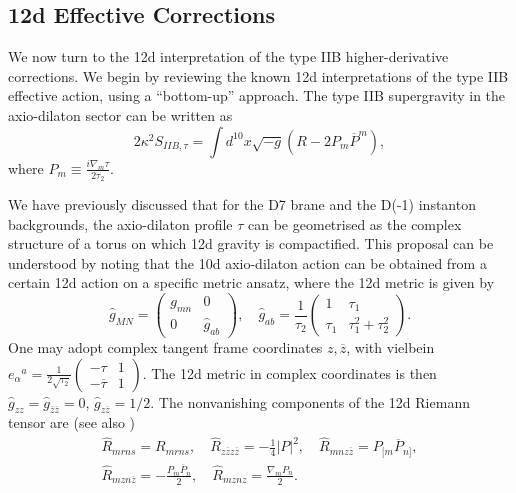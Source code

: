 \subsection{12d Effective Corrections}
We now turn to the 12d interpretation of the type IIB higher-derivative corrections.
We begin by reviewing the known 12d interpretations of the type IIB effective action, using a ``bottom-up'' approach.
The type IIB supergravity in the axio-dilaton sector can be written as
\begin{equation}
2\kappa^2 S_{IIB,\tau}
= \int d^{10}x \sqrt{-g} \left(R - 2 P_m \overline{P}^m\right),
\label{eq:IIB-two-derivative}
\end{equation}
where $P_m \equiv \frac{i\nabla_m \tau}{2\tau_2}$.

We have previously discussed that for the D7 brane and the D(-1) instanton backgrounds, the axio-dilaton profile $\tau$ can be geometrised as the complex structure of a torus on which 12d gravity is compactified.
This proposal can be understood by noting that the 10d axio-dilaton action can be obtained from a certain 12d action on a specific metric ansatz, where the 12d metric is given by
\begin{equation}
\widehat{g}_{MN}=\begin{pmatrix}
g_{mn} & 0 \\
0 &\widehat{g}_{ab}
\end{pmatrix},\quad
\widehat{g}_{ab}
=\frac{1}{\tau_2}\begin{pmatrix}
1& \tau_1\\
\tau_1 & \tau_1^2+\tau_2^2
\end{pmatrix}.
\label{eq:F-theory-ansatze}
\end{equation}
One may adopt complex tangent frame coordinates $z, \overline{z}$, with vielbein $e_{\alpha}{}^a = \frac{1}{2\sqrt{\tau_2}}\begin{pmatrix}
    -\tau & 1 \\ -\overline{\tau} & 1
\end{pmatrix}$. 
The 12d metric in complex coordinates is then
$\widehat{g}_{zz} = \widehat{g}_{\overline{z}\overline{z}} = 0$, $\widehat{g}_{z\overline{z}} = 1/2$.
The nonvanishing components of the 12d Riemann tensor are (see also \cite{Liu:2025uqu})
\begin{equation}
\begin{gathered}
\widehat{R}_{mrns} = R_{mrns},\quad
\widehat{R}_{z\overline{z}z\overline{z}} = -\frac14 |P|^2,\quad
\widehat{R}_{mnz\overline{z}} = P_{[m}\overline{P}_{n]},\\
\widehat{R}_{mzn\overline{z}} = - \frac{P_m \overline{P}_n}{2},\quad
\widehat{R}_{mznz} = \frac{\nabla_m P_n}{2}.
\end{gathered}
\label{eq:12d-Riemann-complex}
\end{equation}

